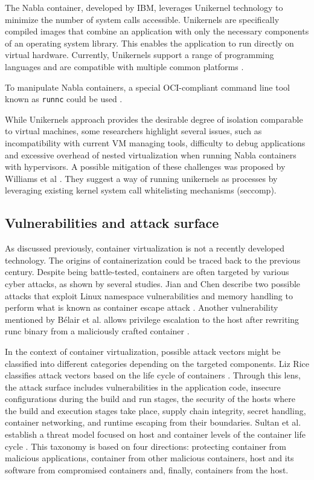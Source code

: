 The Nabla container, developed by IBM, leverages Unikernel technology to minimize the number of system calls accessible. Unikernels are specifically compiled images that combine an application with only the necessary components of an operating system library. This enables the application to run directly on virtual hardware. Currently, Unikernels support a range of programming languages and are compatible with multiple common platforms \cite{acm:4}.

To manipulate Nabla containers, a special OCI-compliant command line tool known as \texttt{runnc} could be used \cite{gh:runnc}.

While Unikernels approach provides the desirable degree of isolation comparable to virtual machines, some researchers highlight several issues, such as incompatibility with current VM managing tools, difficulty to debug applications and excessive overhead of nested virtualization when running Nabla containers with hypervisors. A possible mitigation of these challenges was proposed by Williams et al \cite{acm:4}. They suggest a way of running unikernels as processes by leveraging existing kernel system call whitelisting mechanisms (seccomp).


\clearpage
\subsection{Vulnerabilities and attack surface}

As discussed previously, container virtualization is not a recently developed technology. The origins of containerization could be traced back to the previous century. Despite being battle-tested, containers are often targeted by various cyber attacks, as shown by several studies. Jian and Chen describe two possible attacks that exploit Linux namespace vulnerabilities and memory handling to perform what is known as container escape attack \cite{acm:5}. Another vulnerability mentioned by Bélair et al. allows privilege escalation to the host after rewriting runc binary from a maliciously crafted container \cite{acm:6}.

In the context of container virtualization, possible attack vectors might be classified into different categories depending on the targeted components. Liz Rice classifies attack vectors based on the life cycle of containers \cite{book:rice}. Through this lens, the attack surface includes vulnerabilities in the application code, insecure configurations during the build and run stages, the security of the hosts where the build and execution stages take place, supply chain integrity, secret handling, container networking, and runtime escaping from their boundaries. Sultan et al. establish a threat model focused on host and container levels of the container life cycle \cite{ieee:1}. This taxonomy is based on four directions: protecting container from malicious applications, container from other malicious containers, host and its software from compromised containers and, finally, containers from the host.

